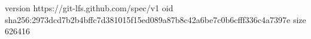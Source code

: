 version https://git-lfs.github.com/spec/v1
oid sha256:2973dcd7b2b4bffc7d381015f15ed089a87b8c42a6be7c0b6cfff336c4a7397e
size 626416

